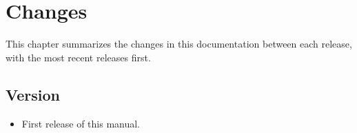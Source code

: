 \chapter{Changes}\label{chap:changes}

This chapter summarizes the changes in this documentation between each \fclang
release, with the most recent releases first.

\section*{Version \fclangversion}

\begin{itemize}
\item First release of this manual.
\end{itemize}

